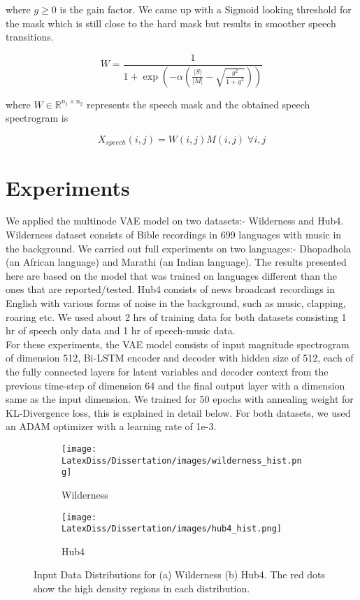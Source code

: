 where $g \ge 0$ is the gain factor. We came up with a Sigmoid looking threshold for the mask which is still close to the hard mask but results in smoother speech transitions.  

\begin{equation}
W = \frac{1}{1 + \exp{(-\alpha(\frac{|S|}{|M|} - \sqrt{\frac{g^2}{1 + g^2}}))}}
\end{equation}

where $W \in \mathbb{R}^{n_1 \times n_2}$ represents the speech mask and the obtained speech spectrogram is

\begin{equation}
X_{speech}(i,j) = W(i,j)M(i,j) \; \forall i,j
\end{equation}

\section{Experiments}
We applied the multinode VAE model on two datasets:- Wilderness and Hub4. Wilderness dataset consists of Bible recordings in 699 languages with music in the background. We carried out full experiments on two languages:- Dhopadhola (an African language) and Marathi (an Indian language). The results presented here are based on the model that was trained on languages different than the ones that are reported/tested. Hub4 consists of news broadcast recordings in English with various forms of noise in the background, such as music, clapping, roaring etc. We used about 2 hrs of training data for both datasets consisting 1 hr of speech only data and 1 hr of speech-music data. \\

For these experiments, the VAE model consists of input magnitude spectrogram of dimension 512, Bi-LSTM encoder and decoder with hidden size of 512, each of the fully connected layers for latent variables and decoder context from the previous time-step of dimension 64 and the final output layer with a dimension same as the input dimension. We trained for 50 epochs with annealing weight for KL-Divergence loss, this is explained in detail below. For both datasets, we used an ADAM optimizer with a learning rate of 1e-3. \\ 


\begin{figure}[h!]
    \centering
    \begin{subfigure}{0.2\textwidth}
    \texttt{[image: LatexDiss/Dissertation/images/wilderness\_hist.png]}
    \caption{Wilderness}
    \end{subfigure}
    \hspace*{\fill}
    \begin{subfigure}{0.2\textwidth}
    \texttt{[image: LatexDiss/Dissertation/images/hub4\_hist.png]}
    \caption{Hub4}
    \end{subfigure}
    \caption{Input Data Distributions for (a) Wilderness (b) Hub4. The red dots show the high density regions in each distribution.}
    \label{fig:distributions}
\end{figure}


